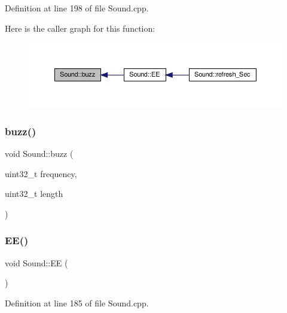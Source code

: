 Definition at line 198 of file Sound.\+cpp.

Here is the caller graph for this function\+:
\nopagebreak
\begin{figure}[H]
\begin{center}
\leavevmode
\includegraphics[width=350pt]{class_sound_a3d0f7b044cff8851a335bb9c4fb78542_icgraph}
\end{center}
\end{figure}
\mbox{\label{class_sound_a3d0f7b044cff8851a335bb9c4fb78542}} 
\subsubsection{\texorpdfstring{buzz()}{buzz()}\hspace{0.1cm}{\footnotesize\ttfamily [2/2]}}
{\footnotesize\ttfamily void Sound\+::buzz (\begin{DoxyParamCaption}\item[{uint32\+\_\+t}]{frequency,  }\item[{uint32\+\_\+t}]{length }\end{DoxyParamCaption})\hspace{0.3cm}{\ttfamily [protected]}}

\mbox{\label{class_sound_a8b4af7ef38cf7e66c6dea94d10a9b229}} 
\subsubsection{\texorpdfstring{E\+E()}{EE()}\hspace{0.1cm}{\footnotesize\ttfamily [1/2]}}
{\footnotesize\ttfamily void Sound\+::\+EE (\begin{DoxyParamCaption}{ }\end{DoxyParamCaption})\hspace{0.3cm}{\ttfamily [protected]}}



Definition at line 185 of file Sound.\+cpp.

